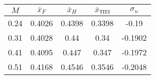 \begin{tabular}{|c|c|c|c|c|}
\hline
$M$ & $\bar{x}_{F}$ & $\bar{x}_{H}$ & $\bar{x}_{ТПЗ}$ & $\sigma_{n}$ \\ 
\hline
0.24 & 0.4026 & 0.4398 & 0.3398 & -0.19 \\ 
\hline
0.31 & 0.4028 & 0.44 & 0.34 & -0.1902 \\ 
\hline
0.41 & 0.4095 & 0.447 & 0.347 & -0.1972 \\ 
\hline
0.51 & 0.4168 & 0.4546 & 0.3546 & -0.2048 \\ 
\hline
\end{tabular}